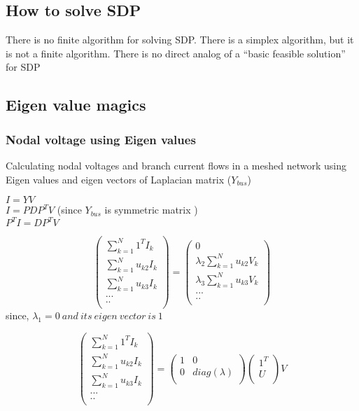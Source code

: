 \documentclass[12pt]{article}
\begin{document}
\subsection{How to solve SDP}
There is no finite algorithm for solving SDP. There is a simplex algorithm, but it is not a finite algorithm. There is no direct analog of a “basic feasible solution” for SDP
\subsection{Eigen value magics}
\subsubsection{Nodal voltage using Eigen values}
Calculating nodal voltages and branch current flows in a meshed network using Eigen values and eigen vectors of Laplacian matrix ($Y_{bus}$)
\begin{center}
$I=YV$ \\  $I=PDP^{T}V$  (since $Y_{bus}$ is symmetric matrix ) \\ $P^{T}I=DP^{T}V$\\  \end{center}
\[\begin{pmatrix} 
\sum_{k=1}^N1^TI_{k} \\
\sum_{k=1}^Nu_{k2}I_{k} \\
\sum_{k=1}^Nu_{k3}I_{k} \\
...\\
..\\\end{pmatrix} =\begin{pmatrix} 0 \\ \lambda_{2}\sum_{k=1}^Nu_{k2}V_{k} \\ \lambda_{3}\sum_{k=1}^Nu_{k3}V_{k} \\...\\..\\\end{pmatrix}\] since, $\lambda_1=0 \ and\  its \ eigen\ vector\ is \ 1$

\[\begin{pmatrix} 
\sum_{k=1}^N1^TI_{k} \\
\sum_{k=1}^Nu_{k2}I_{k} \\
\sum_{k=1}^Nu_{k3}I_{k} \\
...\\
..\\\end{pmatrix} =\begin{pmatrix}1 & 0 \\ 0 & diag(\lambda)\\ \end{pmatrix} \begin{pmatrix}1^T  \\ U \\ \end{pmatrix} V\]
\end{document}
